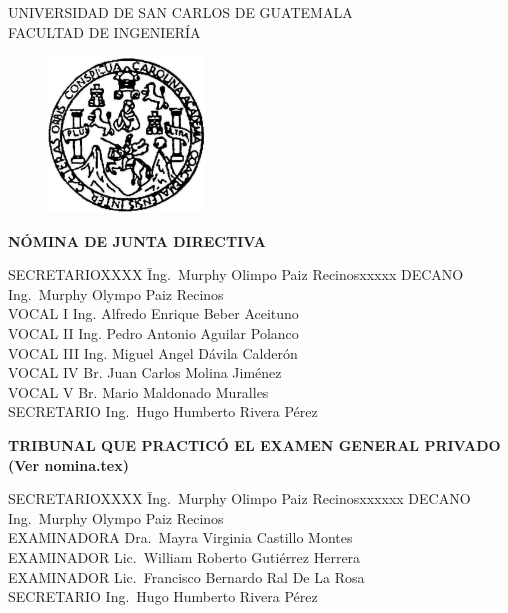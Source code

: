 \thispagestyle{empty}

\begin{center}
UNIVERSIDAD DE SAN CARLOS DE GUATEMALA\\ FACULTAD DE INGENIERÍA
\end{center}

\begin{figure}[h]
  \begin{center}
    \includegraphics[width=4.15cm]{escudo}\\
  \end{center}
\end{figure}

\begin{center}
\textbf{NÓMINA DE JUNTA DIRECTIVA}
\end{center}

\begin{tabbing}
  SECRETARIOXXXX \= Ing.~Murphy Olimpo Paiz Recinosxxxxx  \kill
  DECANO \> Ing.~Murphy Olympo Paiz Recinos \\
  VOCAL I \> Ing. Alfredo Enrique Beber Aceituno\\
  VOCAL II \> Ing. Pedro Antonio Aguilar Polanco\\
  VOCAL III \> Ing. Miguel Angel Dávila Calderón\\
  VOCAL IV \> Br. Juan Carlos Molina Jiménez \\
  VOCAL V \> Br. Mario Maldonado Muralles  \\
  SECRETARIO \> Ing.~Hugo Humberto Rivera Pérez
\end{tabbing}


\begin{center}
\textbf{TRIBUNAL QUE PRACTICÓ EL EXAMEN GENERAL PRIVADO (Ver nomina.tex)}
\end{center}

\begin{tabbing}
  SECRETARIOXXXX \= Ing.~Murphy Olimpo Paiz Recinosxxxxxx  \kill
  DECANO \> Ing.~Murphy Olympo Paiz Recinos \\
  EXAMINADORA \> Dra.~Mayra Virginia Castillo Montes \\
  EXAMINADOR \> Lic.~William Roberto Gutiérrez Herrera \\
  EXAMINADOR \> Lic.~Francisco Bernardo Ral De La Rosa\\
  SECRETARIO \> Ing.~Hugo Humberto Rivera Pérez
\end{tabbing}


